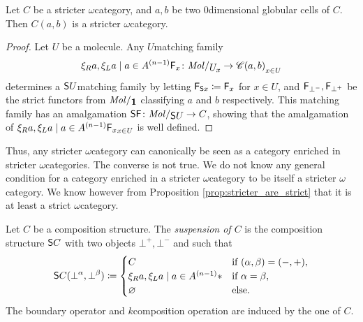 \begin{lem} \label{lem:hom_of_stricter_is_stricter}
    Let \( C \) be a stricter \( \omega \)\nbd category, and \( a, b \) be two \( 0 \)\nbd dimensional globular cells of \( C \).
    Then \( C(a, b) \) is a stricter \( \omega \)\nbd category.
\end{lem}
\begin{proof}
    Let \( U \) be a molecule.
    Any \( U \)\nbd matching family 
    \begin{equation*}
        \set{\F_x \colon \molecin{\imel{U}{x}} \to \C(a, b)}_{x \in U}
    \end{equation*}
    determines a \( \mathsf{S}{U} \)\nbd matching family 
    by letting \( \mathsf{F}_{\mathsf{S}{x}} \coloneqq \mathsf{F}_x \) for \( x \in U \), and \( \mathsf{F}_{\bot^-}, \mathsf{F}_{\bot^+} \) be the strict functors from \( \molecin{\pt} \) classifying \( a \) and \( b \) respectively. 
    This matching family has an amalgamation \( \sus{\F} \colon \molecin{\sus{U}} \to C \), showing that the amalgamation of \( \set{\F_x}_{x \in U} \) is well defined.
\end{proof}

\begin{comm}
    Thus, any stricter \( \omega \)\nbd category can canonically be seen as a category enriched in stricter \( \omega \)\nbd categories.
    The converse is not true. 
    We do not know any general condition for a category enriched in a stricter \( \omega \)\nbd category to be itself a stricter \( \omega \)\nbd category.
    We know however from Proposition \ref{prop:stricter_are_strict} that it is at least a strict \( \omega \)\nbd category.
\end{comm}

\begin{dfn} [Suspension]
    Let \( C \) be a composition structure.
    The \emph{suspension of \( C \)} is the composition structure \( \mathsf{S}{C} \) with two objects \( \bot^+, \bot^- \) and such that
    \begin{equation*}
        \sus{C}(\bot^\a, \bot^\beta) \eqdef 
        \begin{cases}
            C       & \text{if } (\a, \beta) = (-, +),\\
            \set{*} & \text{if } \a = \beta,\\
            \varnothing & \text{else.}
        \end{cases}
    \end{equation*}
    The boundary operator and \( k \)\nbd composition operation are induced by the one of \( C \). 
\end{dfn}


